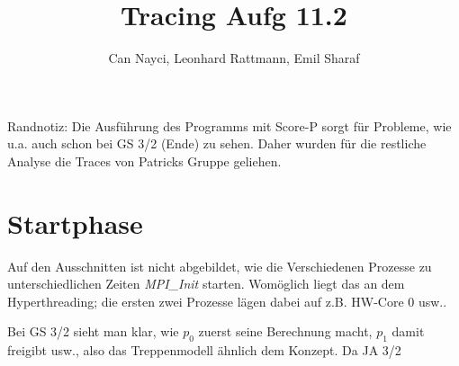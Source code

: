 \documentclass[a4paper,10pt]{article}
\title{Tracing Aufg 11.2}
\author{Can Nayci, Leonhard Rattmann, Emil Sharaf}
\begin{document}
\maketitle

Randnotiz: Die Ausführung des Programms mit Score-P sorgt für Probleme, wie u.a. auch schon bei GS 3/2 (Ende) zu sehen. Daher wurden für die restliche Analyse die Traces von Patricks Gruppe geliehen.

\section{Startphase}
Auf den Ausschnitten ist nicht abgebildet, wie die Verschiedenen Prozesse zu unterschiedlichen Zeiten \textit{MPI\_Init} starten. Womöglich liegt das an dem Hyperthreading; die ersten zwei Prozesse lägen dabei auf z.B. HW-Core 0 usw..

Bei GS 3/2 sieht man klar, wie $p_0$ zuerst seine Berechnung macht, $p_1$ damit freigibt usw., also das Treppenmodell ähnlich dem Konzept. Da JA 3/2
\end{document}
